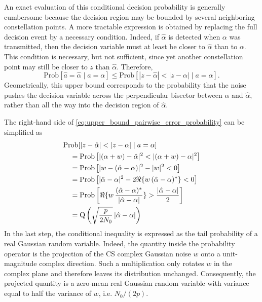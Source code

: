 An exact evaluation of this conditional decision probability is generally cumbersome because the decision region may be bounded by several neighboring constellation points.
A more tractable expression is obtained by replacing the full decision event by a necessary condition.
Indeed, if $\hat{\alpha}$ is detected when $\alpha$ was transmitted, then the decision variable must at least be closer to $\hat{\alpha}$ than to $\alpha$.
This condition is necessary, but not sufficient, since yet another constellation point may still be closer to $z$ than $\hat{\alpha}$.
Therefore,
\begin{equation}
\label{eq:upper_bound_pairwise_error_probability}
    \mathrm{Prob}[\hat{a} = \hat{\alpha} \mid a = \alpha] \leq \mathrm{Prob}[|z - \hat{\alpha}| < |z - \alpha| \mid a = \alpha].
\end{equation}
Geometrically, this upper bound corresponds to the probability that the noise pushes the decision variable across the perpendicular bisector between $\alpha$ and $\hat{\alpha}$, rather than all the way into the decision region of $\hat{\alpha}$.

The right-hand side of \eqref{eq:upper_bound_pairwise_error_probability} can be simplified as
\begin{subequations}
\label{eq:upper_bound_pairwise_error_probability_simplification}
\begin{align}
    &\mathrm{Prob}[|z - \hat{\alpha}| < |z - \alpha| \mid a = \alpha] \notag \\
    & \quad = \mathrm{Prob}\left[|(\alpha + w) - \hat{\alpha}|^2 < |(\alpha + w) - \alpha|^2 \right] \\
    & \quad = \mathrm{Prob}\left[|w - (\hat{\alpha} - \alpha)|^2 - |w|^2 < 0 \right] \\
    & \quad = \mathrm{Prob}\left[|\hat{\alpha} - \alpha|^2 - 2 \Re\{w \, (\hat{\alpha} - \alpha)^*\} < 0 \right] \\
    & \quad = \mathrm{Prob}\left[\Re\{w \, \frac{(\hat{\alpha} - \alpha)^*}{|\hat{\alpha} - \alpha|}\} > \frac{|\hat{\alpha} - \alpha|}{2} \right] \\
    & \quad = \mathrm{Q} \left( \sqrt{\frac{p}{2 N_0}} \, |\hat{\alpha} - \alpha| \right) \label{eq:simplified-upper-bound}
\end{align}
\end{subequations}
In the last step, the conditional inequality is expressed as the tail probability of a real Gaussian random variable.
Indeed, the quantity inside the probability operator is the projection of the \ac{CS} complex Gaussian noise $w$ onto a unit-magnitude complex direction.
Such a multiplication only rotates $w$ in the complex plane and therefore leaves its distribution unchanged.
Consequently, the projected quantity is a zero-mean real Gaussian random variable with variance equal to half the variance of $w$, i.e. $N_0/(2p)$.

